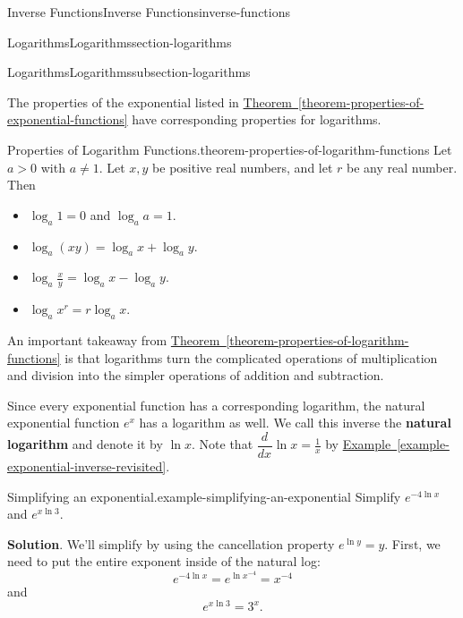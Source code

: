 \documentclass[oneside,10pt,]{book}
\newcommand{\terminology}[1]{\textbf{#1}}
\numberwithin{equation}{section}
\newcommand{\dv}[3][]{\dfrac{d^{#1} #2}{d #3^{#1}}}
\begin{document}
\begin{chapterptx}{Inverse Functions}{}{Inverse Functions}{}{}{inverse-functions}
\begin{sectionptx}{Logarithms}{}{Logarithms}{}{}{section-logarithms}
\begin{subsectionptx}{Logarithms}{}{Logarithms}{}{}{subsection-logarithms}
\par
\hypertarget{p-219}{}%
The properties of the exponential listed in \hyperref[theorem-properties-of-exponential-functions]{Theorem~\ref{theorem-properties-of-exponential-functions}} have corresponding properties for logarithms.%
\begin{theorem}{Properties of Logarithm Functions.}{}{theorem-properties-of-logarithm-functions}%
\hypertarget{p-220}{}%
Let \(a>0\) with \(a\neq1\). Let \(x,y\) be positive real numbers, and let \(r\) be any real number. Then\leavevmode%
\begin{itemize}[label=\textbullet]
\item{}\(\log_{a}1 = 0\) and \(\log_{a}a = 1\).%
\item{}\(\log_{a}(xy) = \log_{a}x + \log_{a}y\).%
\item{}\(\log_{a}\frac{x}{y} = \log_{a}x - \log_{a}y\).%
\item{}\(\log_{a}x^{r} = r\log_{a}x\).%
\end{itemize}
%
\end{theorem}
\hypertarget{p-221}{}%
An important takeaway from \hyperref[theorem-properties-of-logarithm-functions]{Theorem~\ref{theorem-properties-of-logarithm-functions}} is that logarithms turn the complicated operations of multiplication and division into the simpler operations of addition and subtraction.%
\par
\hypertarget{p-222}{}%
Since every exponential function has a corresponding logarithm, the natural exponential function \(e^{x}\) has a logarithm as well. We call this inverse the \terminology{natural logarithm} and denote it by \(\ln x\). Note that \(\dv{}{x}\ln x = \frac{1}{x}\) by \hyperref[example-exponential-inverse-revisited]{Example~\ref{example-exponential-inverse-revisited}}.%
\begin{example}{Simplifying an exponential.}{example-simplifying-an-exponential}%
\hypertarget{p-223}{}%
Simplify \(e^{-4\ln x}\) and \(e^{x\ln3}\).%
\par\smallskip%
\noindent\textbf{Solution}.\hypertarget{solution-48}{}\quad%
\hypertarget{p-224}{}%
We'll simplify by using the cancellation property \(e^{\ln y} = y\). First, we need to put the entire exponent inside of the natural log:%
\begin{equation*}
e^{-4\ln x} = e^{\ln x^{-4}} = x^{-4}
\end{equation*}
and%
\begin{equation*}
e^{x\ln3} = 3^{x}.
\end{equation*}

\end{example}
\end{subsectionptx}
\end{sectionptx}
\end{chapterptx}
\end{document}
